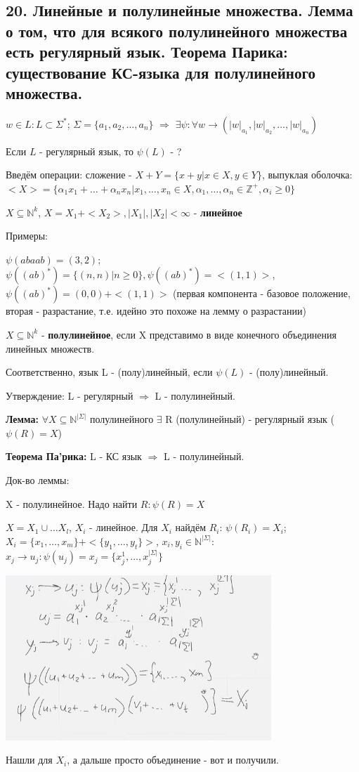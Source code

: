 \subsection{20. Линейные и полулинейные множества. Лемма о том, что для всякого полулинейного множества есть регулярный язык. Теорема Парика: существование КС-языка для полулинейного множества.}

$w \in L: L \subset \Sigma^*$; $\Sigma = \{a_1, a_2, \dots, a_n\}$ $\Rightarrow$ $\exists \psi: \forall w \rightarrow (|w|_{a_1}, |w|_{a_2}, \dots, |w|_{a_n})$

Если $L$ - регулярный язык, то $\psi(L)$ - ?

Введём операции: сложение - $X + Y = \{x + y | x \in X, y \in Y\}$, выпуклая оболочка: $<X> = \{\alpha_1x_1 + \dots + \alpha_nx_n| x_1, \dots, x_n \in X, \alpha_1, \dots, \alpha_n \in \mathbb{Z}^+, \alpha_i \geqslant 0 \}$

$X \subseteq \mathbb{N}^k$, $X = X_1 + <X_2>, |X_1|, |X_2| < \infty$ - \textbf{линейное}

Примеры:

$\psi(abaab) = (3, 2)$; $\psi((ab)^*) = \{(n, n) | n \geqslant 0\}, \psi((ab)^*) = <(1, 1)>$, $\psi((ab)^*) = (0, 0) + <(1, 1)>$ (первая компонента - базовое положение, вторая - разрастание, т.е. идейно это похоже на лемму о разрастании)

$X \subseteq \mathbb{N}^k$ - \textbf{полулинейное}, если X представимо в виде конечного объединения линейных множеств.

Соответственно, язык L - (полу)линейный, если $\psi(L)$ - (полу)линейный.

Утверждение: L - регулярный $\Rightarrow$ L - полулинейный.

\textbf{Лемма:} $\forall X \subseteq \mathbb{N}^{|\Sigma|}$ полулинейного $\exists$ R (полулинейный) - регулярный язык ($\psi(R) = X$)

\textbf{Теорема Па'рика:} L - КС язык $\Rightarrow$ L - полулинейный.

Док-во леммы:

X - полулинейное. Надо найти $R: \psi(R) = X$

$X =X_1 \cup \dots X_l$, $X_i$ - линейное. Для $X_i$ найдём $R_i$: $\psi(R_i) = X_i$; $X_i = \{x_1, \dots, x_m\} + <\{y_1, \dots, y_t\}>$, $x_i, y_i \in \mathbb{N}^{|\Sigma |}$: $x_j \rightarrow u_j: \psi (u_j) = x_j = \{ x_j^1, \dots, x_j^{|\Sigma | } \}$

\includegraphics[width=10cm]{images/parikh.JPG}

Нашли для $X_i$, а дальше просто объединение - вот и получили.

